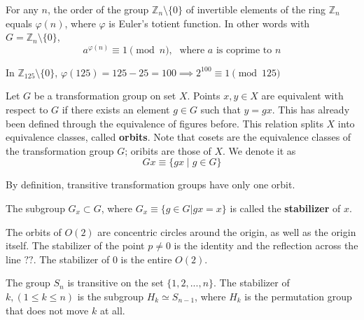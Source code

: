   \begin{theorem}
    For any $n$, the order of the group $\mathbb{Z}_{n} \setminus \{0\}$ of invertible elements of the ring $\mathbb{Z}_{n}$ equals $\varphi(n)$, where $\varphi$ is Euler's totient function. In other words with $G = \mathbb{Z}_{n} \setminus \{0\}$, 
    \begin{equation}
      a^{\varphi(n)} \equiv 1 \pmod{n}, \; \text{ where $a$ is coprime to $n$}
    \end{equation}
  \end{theorem}

  \begin{example}
    In $\mathbb{Z}_{125} \setminus \{0\}$, $\varphi(125) = 125 - 25 = 100 \implies 2^{100} \equiv 1 \pmod{125}$
  \end{example}

  \begin{definition}
    Let $G$ be a transformation group on set $X$. Points $x, y \in X$ are equivalent with respect to $G$ if there exists an element $g \in G$ such that $y = g x$. This has already been defined through the equivalence of figures before. This relation splits $X$ into equivalence classes, called \textbf{orbits}. Note that cosets are the equivalence classes of the transformation group $G$; oribits are those of $X$. We denote it as
    \begin{equation}
      Gx \equiv \{ g x \;|\;g \in G \}
    \end{equation}
  \end{definition}

  By definition, transitive transformation groups have only one orbit.

  \begin{definition}
    The subgroup $G_{x} \subset G$, where $G_{x} \equiv \{ g \in G | g x = x\}$ is called the \textbf{stabilizer} of $x$.
  \end{definition}

  \begin{example}
    The orbits of $O(2)$ are concentric circles around the origin, as well as the origin itself. The stabilizer of the point $p \neq 0$ is the identity and the reflection across the line $??$. The stabilizer of $0$ is the entire $O(2)$.
  \end{example}

  \begin{example}
    The group $S_n$ is transitive on the set $\{1, 2, ..., n\}$. The stabilizer of $k, (1 \leq k \leq n)$ is the subgroup $H_{k} \simeq S_{n-1}$, where $H_k$ is the permutation group that does not move $k$ at all. 
  \end{example}

